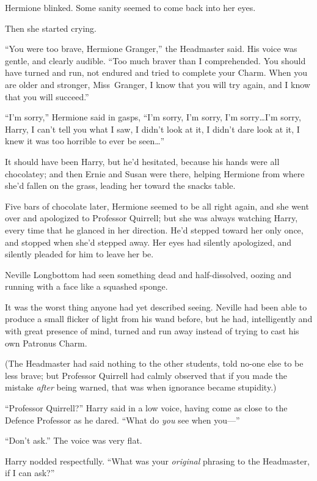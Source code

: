 Hermione blinked. Some sanity seemed to come back into her eyes.

Then she started crying.

“You were too brave, Hermione Granger,” the Headmaster said. His voice was gentle, and clearly audible. “Too much braver than I comprehended. You should have turned and run, not endured and tried to complete your Charm. When you are older and stronger, Miss~Granger, I know that you will try again, and I know that you will succeed.”

“I’m sorry,” Hermione said in gasps, “I’m sorry, I’m sorry, I’m sorry…I’m sorry, Harry, I can’t tell you what I saw, I didn’t look at it, I didn’t dare look at it, I knew it was too horrible to ever be seen…”

It should have been Harry, but he’d hesitated, because his hands were all chocolatey; and then Ernie and Susan were there, helping Hermione from where she’d fallen on the grass, leading her toward the snacks table.

Five bars of chocolate later, Hermione seemed to be all right again, and she went over and apologized to Professor Quirrell; but she was always watching Harry, every time that he glanced in her direction. He’d stepped toward her only once, and stopped when she’d stepped away. Her eyes had silently apologized, and silently pleaded for him to leave her be.

\later

Neville Longbottom had seen something dead and half-dissolved, oozing and running with a face like a squashed sponge.

It was the worst thing anyone had yet described seeing. Neville had been able to produce a small flicker of light from his wand before, but he had, intelligently and with great presence of mind, turned and run away instead of trying to cast his own Patronus Charm.

(The Headmaster had said nothing to the other students, told no-one else to be less brave; but Professor Quirrell had calmly observed that if you made the mistake \emph{after} being warned, that was when ignorance became stupidity.)

“Professor Quirrell?” Harry said in a low voice, having come as close to the Defence Professor as he dared. “What do \emph{you} see when you—”

“Don’t ask.” The voice was very flat.

Harry nodded respectfully. “What was your \emph{original} phrasing to the Headmaster, if I can ask?”

